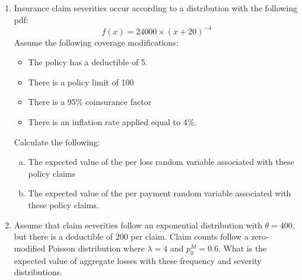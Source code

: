 \documentclass{article}
\begin{document}
\begin{enumerate}
\item Insurance claim severities occur according to a distribution with the following pdf:
\[f(x) = 24000 \times (x+20)^{-4} \]
Assume the following coverage modifications:
\begin{itemize}
\item The policy has a deductible of 5. 
\item There is a policy limit of 100
\item There is a 95\% coinsurance factor
\item There is an inflation rate applied equal to 4\%. 
\end{itemize}
Calculate the following:
 \begin{enumerate}[(a)]
\item The expected value of the per loss random variable associated with these policy claims
\item The expected value of the per payment random variable associated with these policy claims. 
\end{enumerate}

\item Assume that claim severities follow an exponential distribution with $\theta = 400$, but there is a deductible of 200 per claim. Claim counts follow a zero-modified Poisson distribution where $\lambda = 4$ and $p_0^M = 0.6$. What is the expected value of aggregate losses with these frequency and severity distributions. 

\end{enumerate}
\end{document}

